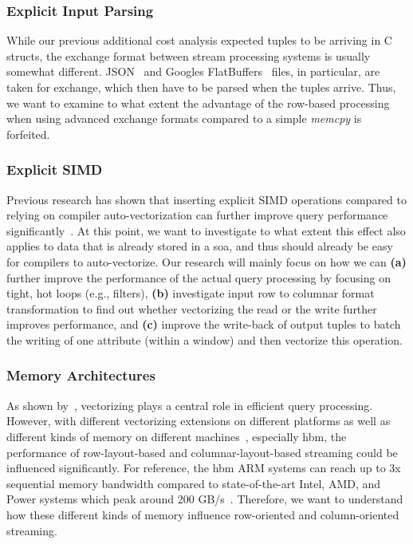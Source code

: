 \subsubsection{Explicit Input Parsing}
While our previous additional cost analysis expected tuples to be arriving in C structs, the exchange format between stream processing systems is usually somewhat different.
JSON~\cite{DBLP:journals/pvldb/PalkarABZ18,DBLP:journals/vldb/LangdaleL19,DBLP:journals/pvldb/LiKCGK17} and Googles FlatBuffers~\cite{googleflatbuffers} files, in particular, are taken for exchange, which then have to be parsed when the tuples arrive.
Thus, we want to examine to what extent the advantage of the row-based processing when using advanced exchange formats compared to a simple \emph{memcpy} is forfeited.

\subsubsection{Explicit SIMD}

Previous research has shown that inserting explicit SIMD operations compared to relying on compiler auto-vectorization can further improve query performance significantly~\cite{DBLP:journals/pvldb/KerstenLKNPB18}.
At this point, we want to investigate to what extent this effect also applies to data that is already stored in a \ac{soa}, and thus should already be easy for compilers to auto-vectorize.
Our research will mainly focus on how we can \textbf{(a)} further improve the performance of the actual query processing by focusing on tight, hot loops (e.g., filters), \textbf{(b)} investigate input row to columnar format transformation to find out whether vectorizing the read or the write further improves performance, and \textbf{(c)} improve the write-back of output tuples to batch the writing of one attribute (within a window) and then vectorize this operation.
 
\subsubsection{Memory Architectures}

As shown by~\citet{DBLP:journals/pvldb/KerstenLKNPB18}, vectorizing plays a central role in efficient query processing.
However, with different vectorizing extensions on different platforms as well as different kinds of memory on different machines~\cite[]{bollmeier2021processor}, especially \ac{hbm}, the performance of row-layout-based and columnar-layout-based streaming could be influenced significantly.
For reference, the \ac{hbm} ARM systems can reach up to 3x sequential memory bandwidth compared to state-of-the-art Intel, AMD, and Power systems which peak around 200 GB/s~\cite[]{bollmeier2021processor}.
Therefore, we want to understand how these different kinds of memory influence row-oriented and column-oriented streaming.

